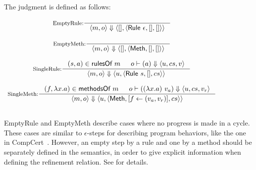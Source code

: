\begin{definition}
  \label{def-semsstep}
  The judgment  is defined as follows:
  \begin{center}
    \begin{math}
      \begin{array}{c}
        \inference[EmptyRule:]{}
                  {\semsstep{m}{o}{\emptymap}
                    {\alpharule{\epsilon}}{\emptymap}{\emptymap}} \\
        \mbox{} \\
        \inference[EmptyMeth:]{}
                  {\semsstep{m}{o}{\emptymap}
                    {\alphameth}{\emptymap}{\emptymap}} \\
        \mbox{} \\
        \inference[SingleRule:]{\rulepair{s}{a} \in \rulesofm{m} & \semact{o}{a}{u}{cs}{v}}
                  {\semsstep{m}{o}{u}{\alpharule{s}}{\emptymap}{cs}} \\
        \mbox{} \\
        \inference[SingleMeth:]{\methodpair{f}{\lambda x.a} \in \methsofm{m} &
          \semact{o}{(\lambda x.a)\ v_a}{u}{cs}{v_r}}
                  {\semsstep{m}{o}{u}{\alphameth{}}{\lblupd{}{f}{(v_a, v_r)}}{cs}} \\
        \mbox{} \\
      \end{array}
    \end{math}
  \end{center}
\end{definition}

EmptyRule and EmptyMeth describe cases where no progress is made in a
cycle. These cases are similar to $\epsilon$-steps for describing
program behaviors, like the one in CompCert~\cite{TODO}. However, an
empty step by a rule and one by a method should be separately defined
in the \Substep{} semantics, in order to give explicit information
when defining the refinement relation. See  for details.

